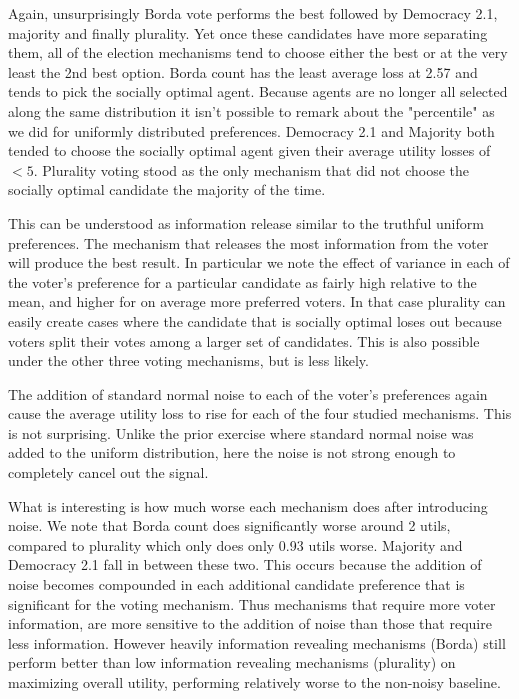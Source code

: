 \documentclass[11pt]{scrartcl}
\begin{document}
Again, unsurprisingly Borda vote performs the best followed by Democracy 2.1, majority and finally plurality. Yet once these candidates have more separating them, all of the election mechanisms tend to choose either the best or at the very least the 2nd best option. Borda count has the least average loss at 2.57 and tends to pick the socially optimal agent. Because agents are no longer all selected along the same distribution it isn't possible to remark about the "percentile" as we did for uniformly distributed preferences. Democracy 2.1 and Majority both tended to choose the socially optimal agent given their average utility losses of $<5$. Plurality voting stood as the only mechanism that did not choose the socially optimal candidate the majority of the time.

This can be understood as information release similar to the truthful uniform preferences. The mechanism that releases the most information from the voter will produce the best result. In particular we note the effect of variance in each of the voter's preference for a particular candidate as fairly high relative to the mean, and higher for on average more preferred voters. In that case plurality can easily create cases where the candidate that is socially optimal loses out because voters split their votes among a larger set of candidates. This is also possible under the other three voting mechanisms, but is less likely.

The addition of standard normal noise to each of the voter's preferences again cause the average utility loss to rise for each of the four studied mechanisms. This is not surprising. Unlike the prior exercise where standard normal noise was added to the uniform distribution, here the noise is not strong enough to completely cancel out the signal.

What is interesting is how much worse each mechanism does after introducing noise. We note that Borda count does significantly worse around 2 utils, compared to plurality which only does only 0.93 utils worse. Majority and Democracy 2.1 fall in between these two. This occurs because the addition of noise becomes compounded in each additional candidate preference that is significant for the voting mechanism. Thus mechanisms that require more voter information, are more sensitive to the addition of noise than those that require less information. However heavily information revealing mechanisms (Borda) still perform better than low information revealing mechanisms (plurality) on maximizing overall utility, performing relatively worse to the non-noisy baseline.
\end{document}
